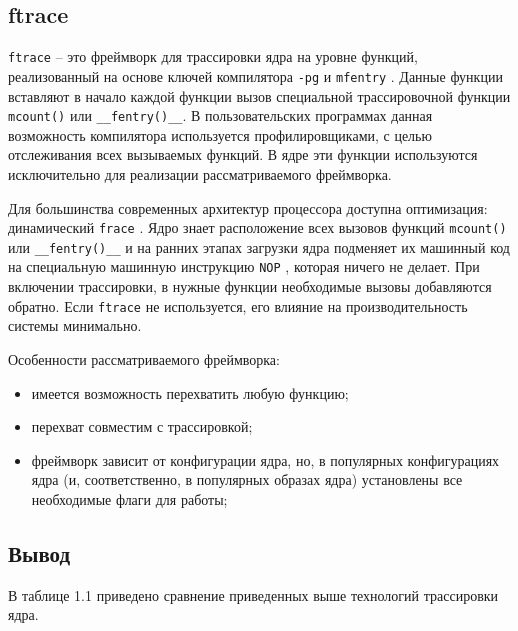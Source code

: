 \subsection{ftrace}

\texttt{ftrace} \cite{ftrace} -- это фреймворк для трассировки ядра на уровне функций, реализованный на основе ключей компилятора \texttt{-pg} \cite{ftrace-habr} и \texttt{mfentry} \cite{ftrace-habr}. Данные функции вставляют в начало каждой функции вызов специальной трассировочной функции \texttt{mcount()} или \texttt{\_\_fentry()\_\_}. В пользовательских программах данная возможность компилятора используется профилировщиками, с целью отслеживания всех вызываемых функций. В ядре эти функции используются исключительно для реализации рассматриваемого фреймворка.

Для большинства современных архитектур процессора доступна оптимизация: динамический \texttt{frace} \cite{ftrace-habr}. Ядро знает расположение всех вызовов функций \texttt{mcount()} или \texttt{\_\_fentry()\_\_} и на ранних этапах загрузки ядра подменяет их машинный код на специальную машинную инструкцию \texttt{NOP} \cite{NOP}, которая ничего не делает. При включении трассировки, в нужные функции необходимые вызовы добавляются обратно. Если \texttt{ftrace} не используется, его влияние на производительность системы минимально.

Особенности рассматриваемого фреймворка:

\begin{itemize}
	\item имеется возможность перехватить любую функцию;
	\item перехват совместим с трассировкой;
	\item фреймворк зависит от конфигурации ядра, но, в популярных конфигурациях ядра (и, соответственно, в популярных образах ядра) установлены все необходимые флаги для работы; 
\end{itemize}

\subsection*{Вывод}

В таблице 1.1 приведено сравнение приведенных выше технологий трассировки ядра. 

